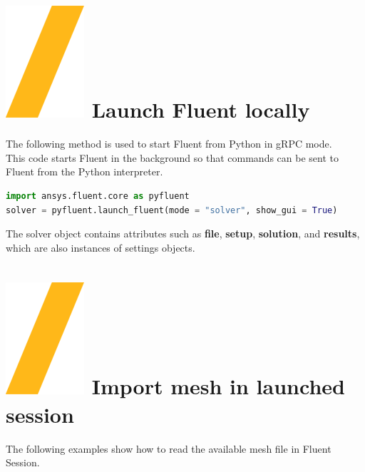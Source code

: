 \documentclass[9pt,landscape]{article}
\begin{document}
\begin{multicols}{3}
\setlength{\premulticols}{1pt}
\setlength{\postmulticols}{1pt}
\setlength{\multicolsep}{1pt}
\setlength{\columnsep}{2pt}

\vfill
\section{\includegraphics[height=\fontcharht\font`\S]{slash.png} Launch Fluent locally}
The following method is used to start Fluent from Python in gRPC mode.\\
This code starts Fluent in the background so that commands can be sent to Fluent from the Python interpreter.

\begin{lstlisting}[language=Python]
import ansys.fluent.core as pyfluent
solver = pyfluent.launch_fluent(mode = "solver", show_gui = True)
\end{lstlisting}

The solver object contains attributes such as \textbf{file}, \textbf{setup}, \textbf{solution}, and \textbf{results}, 
which are also instances of settings objects. 

\section{\includegraphics[height=\fontcharht\font`\S]{slash.png} Import mesh in launched session}

The following examples show how to read the available mesh file in Fluent Session.


\end{multicols}
\end{document}
